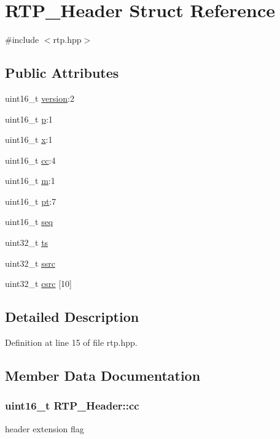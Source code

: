 \hypertarget{struct_r_t_p___header}{
\section{RTP\_\-Header Struct Reference}
\label{struct_r_t_p___header}
}


{\ttfamily \#include $<$rtp.hpp$>$}

\subsection*{Public Attributes}
\begin{DoxyCompactItemize}
\item 
uint16\_\-t \hyperlink{struct_r_t_p___header_a0168330394469ead3fc335170f3af3a3}{version}:2
\item 
uint16\_\-t \hyperlink{struct_r_t_p___header_aeabffdd4140a4124c5bc789d8fe3f258}{p}:1
\item 
uint16\_\-t \hyperlink{struct_r_t_p___header_a1d0f8d9f53925ca9e420d9c4b78d1e31}{x}:1
\item 
uint16\_\-t \hyperlink{struct_r_t_p___header_af5491dd22e1e1f796837a27709345263}{cc}:4
\item 
uint16\_\-t \hyperlink{struct_r_t_p___header_a8ced1d32ad111aac77f73d3b671ec0c7}{m}:1
\item 
uint16\_\-t \hyperlink{struct_r_t_p___header_a2a81495ae755559520d0cecf66f1a125}{pt}:7
\item 
uint16\_\-t \hyperlink{struct_r_t_p___header_a9a43990de1ed2f04d711bf090360172d}{seq}
\item 
uint32\_\-t \hyperlink{struct_r_t_p___header_afa91b2845c6256f0a389eb0e186bf398}{ts}
\item 
uint32\_\-t \hyperlink{struct_r_t_p___header_a895a7627b17b1d241539f94c806a901d}{ssrc}
\item 
uint32\_\-t \hyperlink{struct_r_t_p___header_acdfaa8f4452ef3bf02041d4b2f79ef45}{csrc} \mbox{[}10\mbox{]}
\end{DoxyCompactItemize}


\subsection{Detailed Description}


Definition at line 15 of file rtp.hpp.



\subsection{Member Data Documentation}
\hypertarget{struct_r_t_p___header_af5491dd22e1e1f796837a27709345263}{
\subsubsection[{cc}]{\setlength{\rightskip}{0pt plus 5cm}uint16\_\-t {\bf RTP\_\-Header::cc}}}
\label{struct_r_t_p___header_af5491dd22e1e1f796837a27709345263}
header extension flag 

